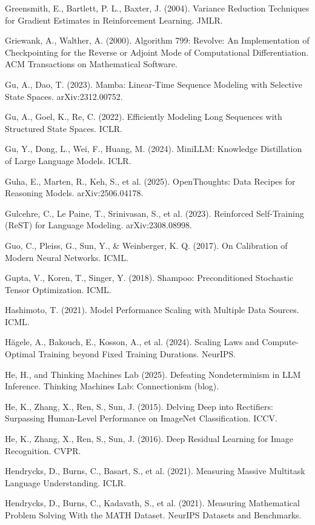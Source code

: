 {\begin{enumerate}[leftmargin=*,itemsep=1pt,label={[\arabic*]}]
\item Greensmith, E., Bartlett, P. L., Baxter, J. (2004). Variance Reduction Techniques for Gradient Estimates in Reinforcement Learning. JMLR.
\item Griewank, A., Walther, A. (2000). Algorithm 799: Revolve: An Implementation of Checkpointing for the Reverse or Adjoint Mode of Computational Differentiation. ACM Transactions on Mathematical Software.
\item Gu, A., Dao, T. (2023). Mamba: Linear-Time Sequence Modeling with Selective State Spaces. arXiv:2312.00752.
\item Gu, A., Goel, K., Re, C. (2022). Efficiently Modeling Long Sequences with Structured State Spaces. ICLR.
\item Gu, Y., Dong, L., Wei, F., Huang, M. (2024). MiniLLM: Knowledge Distillation of Large Language Models. ICLR.
\item Guha, E., Marten, R., Keh, S., et al. (2025). OpenThoughts: Data Recipes for Reasoning Models. arXiv:2506.04178.
\item Gulcehre, C., Le Paine, T., Srinivasan, S., et al. (2023). Reinforced Self-Training (ReST) for Language Modeling. arXiv:2308.08998.
\item Guo, C., Pleiss, G., Sun, Y., \& Weinberger, K. Q. (2017). On Calibration of Modern Neural Networks. ICML.
\item Gupta, V., Koren, T., Singer, Y. (2018). Shampoo: Preconditioned Stochastic Tensor Optimization. ICML.
\item Hashimoto, T. (2021). Model Performance Scaling with Multiple Data Sources. ICML.
\item Hägele, A., Bakouch, E., Kosson, A., et al. (2024). Scaling Laws and Compute-Optimal Training beyond Fixed Training Durations. NeurIPS.
\item He, H., and Thinking Machines Lab (2025). Defeating Nondeterminism in LLM Inference. Thinking Machines Lab: Connectionism (blog).
\item He, K., Zhang, X., Ren, S., Sun, J. (2015). Delving Deep into Rectifiers: Surpassing Human-Level Performance on ImageNet Classification. ICCV.
\item He, K., Zhang, X., Ren, S., Sun, J. (2016). Deep Residual Learning for Image Recognition. CVPR.
\item Hendrycks, D., Burns, C., Basart, S., et al. (2021). Measuring Massive Multitask Language Understanding. ICLR.
\item Hendrycks, D., Burns, C., Kadavath, S., et al. (2021). Measuring Mathematical Problem Solving With the MATH Dataset. NeurIPS Datasets and Benchmarks.

\end{enumerate}}
